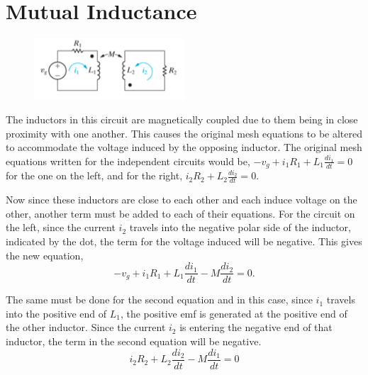 \documentclass[12pt]{article}
\begin{document}
    \section*{Mutual Inductance}
    \begin{figure}[h]
        \centering
        \includegraphics[width=0.5\textwidth]{Coupled Inductors.png}
    \end{figure}
    \par The inductors in this circuit are magnetically coupled due to them
    being in close proximity with one another. This causes the original mesh
    equations to be altered to accommodate the voltage induced by the opposing
    inductor. The original mesh equations written for the independent circuits
    would be, $-v_g + i_1R_1 + L_1 \frac{di_1}{dt} = 0$ for the one on the left,
    and for the right, $i_2R_2 + L_2 \frac{di_2}{dt} = 0$.
    \par Now since these inductors are close to each other and each induce
    voltage on the other, another term must be added to each of their equations.
    For the circuit on the left, since the current $i_2$ travels into the
    negative polar side of the inductor, indicated by the dot, the term for the
    voltage induced will be negative. This gives the new equation,
    \[
        -v_g + i_1R_1 + L_1 \frac{di_1}{dt} - M \frac{di_2}{dt} = 0
    .\]
    \par The same must be done for the second equation and in this case, since
    $i_1$ travels into the positive end of $L_1$, the positive emf is generated
    at the positive end of the other inductor. Since the current $i_2$ is
    entering the negative end of that inductor, the term in the second equation
    will be negative.
    \[
        i_2R_2 + L_2 \frac{di_2}{dt} - M \frac{di_1}{dt} = 0
    \]
\end{document}
